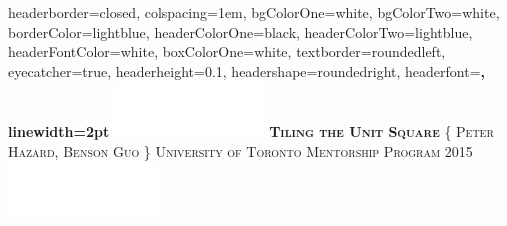 \documentclass[landscape,a0paper,fontscale=0.255]{baposter} %
\begin{document}
\begin{poster}
{
headerborder=closed, %
colspacing=1em, %
bgColorOne=white, %
bgColorTwo=white, %
borderColor=lightblue, %
headerColorOne=black, %
headerColorTwo=lightblue, %
headerFontColor=white, %
boxColorOne=white, %
textborder=roundedleft, %
eyecatcher=true, %
headerheight=0.1\textheight, %
headershape=roundedright, %
headerfont=\Large\bf\textsc, %
linewidth=2pt %
}
%
{\includegraphics[height=4em]{logo.png}} %
{\bf\textsc{Tiling the Unit Square}\vspace{0.5em}} %
{\textsc{\{ Peter Hazard, Benson Guo \} \hspace{12pt} University of Toronto Mentorship Program 2015}} %
{\includegraphics[height=4em]{logo.png}} %



\end{poster}
\end{document}
